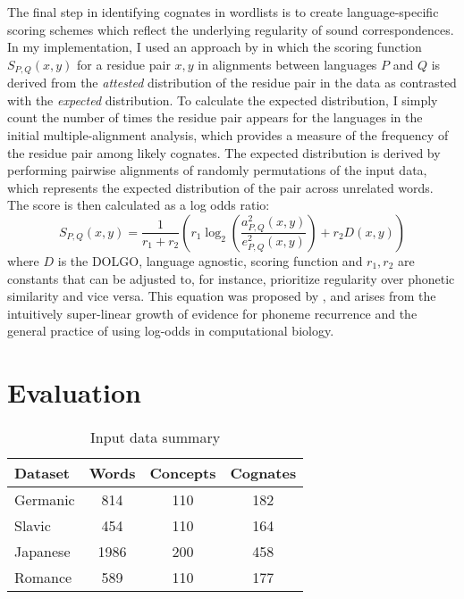 \documentclass[doc,natbib,11pt]{apa6}
\begin{document}
The final step in identifying cognates in wordlists is to create language-specific scoring schemes which reflect the underlying regularity of sound correspondences. In my implementation, I used an approach by \citet{Kessler2001} in which the scoring function $S_{P,Q}(x,y)$ for a residue pair $x,y$ in alignments between languages $P$ and $Q$ is derived from the \emph{attested} distribution of the residue pair in the data as contrasted with the \emph{expected} distribution. To calculate the expected distribution, I simply count the number of times the residue pair appears for the languages in the initial multiple-alignment analysis, which provides a measure of the frequency of the residue pair among likely cognates. The expected distribution is derived by performing pairwise alignments of randomly permutations of the input data, which represents the expected distribution of the pair across unrelated words. The  score is then calculated as a log odds ratio: 
\begin{equation}
S_{P,Q}(x,y) = \frac{1}{r_1+r_2}\left(r_1\log_2\left(\frac{a^2_{P,Q}(x,y)}{e^2_{P,Q}(x,y)}\right)+r_2D(x,y)\right)
\end{equation}
where $D$ is the DOLGO, language agnostic, scoring function and $r_1,r_2$ are constants that can be adjusted to, for instance, prioritize regularity over phonetic similarity and vice versa. This equation was proposed by \citet{List2012}, and arises from the intuitively super-linear growth of evidence for phoneme recurrence and the general practice of using log-odds in computational biology. 

\section{Evaluation}



\begin{table}
	\centering
	\begin{tabular}{|l|ccc|}\hline
	Dataset & Words & Concepts & Cognates\\\hline
	Germanic & 814 & 110 & 182 \\
	Slavic & 454 & 110 & 164 \\ 
	Japanese & 1986 & 200 & 458\\
	Romance & 589 & 110 & 177\\\hline
	\end{tabular}
	\caption{Input data summary}
	\label{table:3}
\end{table}
\end{document}
